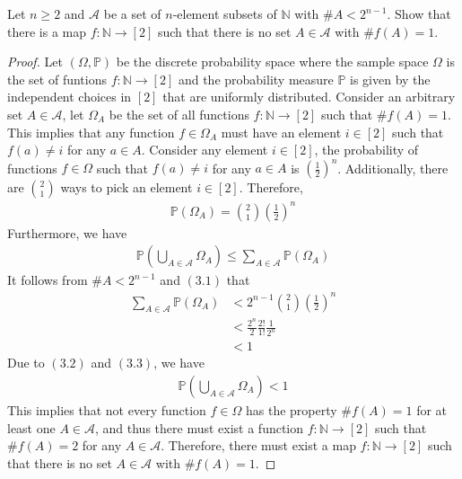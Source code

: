 \begin{problem}
Let $n \geq 2$ and $\mathcal{A}$ be a set of $n$-element subsets of $\mathbb{N}$ with $\# A < 2^{n-1}$. Show that there is a map $f : \mathbb{N} \to [2]$ such that there is no set $A \in \mathcal{A}$ with $\# f(A)=1$.
\end{problem}
\begin{proof}
Let $(\Omega, \mathbb{P})$ be the discrete probability space where the sample space $\Omega$ is the set of funtions $f: \mathbb{N} \to [2]$ and the probability measure $\mathbb{P}$ is given by the independent choices in $[2]$ that are uniformly distributed. Consider an arbitrary set $A \in \mathcal{A}$, let $\Omega_{A}$ be the set of all functions $f: \mathbb{N} \to [2]$ such that $\# f(A) = 1$. This implies that any function $f \in \Omega_{A}$ must have an element $i \in [2]$ such that $f(a) \neq i$ for any $a \in A$. Consider any element $i \in [2]$, the probability of functions $f \in \Omega$ such that $f(a) \neq i$ for any $a \in A$ is $\left( \frac{1}{2} \right)^{n}$. Additionally, there are $\binom{2}{1}$ ways to pick an element $ i\in [2]$. Therefore,
\begin{align*}
    \mathbb{P}(\Omega_{A}) = \binom{2}{1} \left( \frac{1}{2} \right)^{n} \tag{3.1}
\end{align*}
Furthermore, we have 
\begin{align*} 
    \mathbb{P}\left( \bigcup_{A \in \mathcal{A}} \Omega_{A} \right) \leq \sum_{A \in \mathcal{A}} \mathbb{P}(\Omega_{A}) \tag{3.2}
\end{align*}
It follows from $\# A < 2^{n-1}$ and $(3.1)$ that
\begin{align*}
    \sum_{A \in \mathcal{A}} \mathbb{P}(\Omega_{A}) &< 2^{n-1} \binom{2}{1} \left( \frac{1}{2} \right)^{n} \\
    &< \frac{2^{n}}{2} \frac{2!}{1!} \frac{1}{2^{n}} \\
    &< 1 \tag{3.3}
\end{align*}
Due to $(3.2)$ and $(3.3)$, we have
\begin{align*}
    \mathbb{P}\left( \bigcup_{A \in \mathcal{A}} \Omega_{A} \right) < 1
\end{align*}
This implies that not every function $f \in \Omega$ has the property $\# f(A) = 1$ for at least one $A \in \mathcal{A}$, and thus there must exist a function $f : \mathbb{N} \to [2]$ such that $\# f(A) = 2$ for any $A \in \mathcal{A}$. Therefore, there must exist a map $f : \mathbb{N} \to [2]$ such that there is no set $A \in \mathcal{A}$ with $\# f(A) = 1$.
\end{proof}
